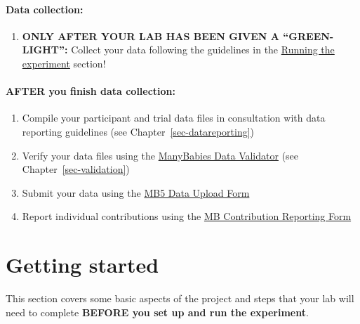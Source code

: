 \documentclass[
  letterpaper,
  DIV=11,
  numbers=noendperiod,
  oneside]{scrreprt}
\providecommand{\tightlist}{%
  \setlength{\itemsep}{0pt}\setlength{\parskip}{0pt}}
\begin{document}
\subsection{Data collection:}\label{data-collection}

\begin{enumerate}
\def\labelenumi{(\arabic{enumi})}
\setcounter{enumi}{11}
\tightlist
\item
  \textbf{ONLY AFTER YOUR LAB HAS BEEN GIVEN A ``GREEN-LIGHT'':} Collect
  your data following the guidelines in the
  \hyperref[sec-running]{Running the experiment} section!
\end{enumerate}

\subsection{AFTER you finish data
collection:}\label{after-you-finish-data-collection}

\begin{enumerate}
\def\labelenumi{(\arabic{enumi})}
\setcounter{enumi}{12}
\tightlist
\item
  Compile your participant and trial data files in consultation with
  data reporting guidelines (see Chapter~\ref{sec-datareporting})
\item
  Verify your data files using the
  \href{https://manybabies.org/validator/}{ManyBabies Data Validator}
  (see Chapter~\ref{sec-validation})
\item
  Submit your data using the
  \href{https://airtable.com/appRoqMKzcK3NsXt4/pagTs6VPOhcjesYd5/form}{MB5
  Data Upload Form}
\item
  Report individual contributions using the
  \href{https://manybabies.org/credit/}{MB Contribution Reporting Form}
\end{enumerate}

\part{Getting started}

This section covers some basic aspects of the project and steps that
your lab will need to complete \textbf{BEFORE you set up and run the
experiment}.
\end{document}
